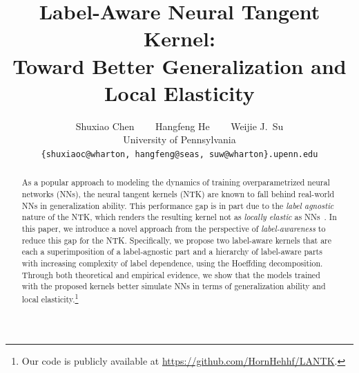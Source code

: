\documentclass{article}
\title{Label-Aware Neural Tangent Kernel: \\ Toward Better Generalization and Local Elasticity}
\author{Shuxiao Chen \quad~~~ Hangfeng He \quad~~~ Weijie J.~Su\\[0.5em]
University of Pennsylvania\\[0.3em]
\texttt{\{shuxiaoc@wharton, hangfeng@seas, suw@wharton\}.upenn.edu}\\
}
\begin{document}
\maketitle


\begin{abstract}
As a popular approach to modeling the dynamics of training overparametrized neural networks (NNs), the neural tangent kernels (NTK) are known to fall behind real-world NNs in generalization ability. This performance gap is in part due to the \textit{label agnostic} nature of the NTK, which renders the resulting kernel not as \textit{locally elastic} as NNs~\citep{he2019local}. In this paper, we introduce a novel approach from the perspective of \emph{label-awareness} to reduce this gap for the NTK. Specifically, we propose two label-aware kernels that are each a superimposition of a label-agnostic part and a hierarchy of label-aware parts with increasing complexity of label dependence, using the Hoeffding decomposition. Through both theoretical and empirical evidence, we show that the models trained with the proposed kernels better simulate NNs in terms of generalization ability and local elasticity.\footnote{Our code is publicly available at \url{https://github.com/HornHehhf/LANTK}.}




\end{abstract}
\end{document}
